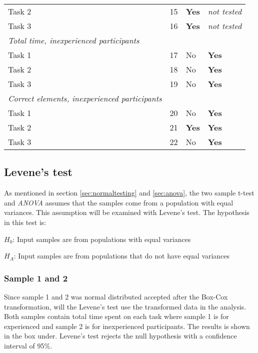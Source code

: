 \begin{longtable}{p{}|l|p{2cm}|p{}}
		Task 2 & 15 & \textbf{Yes}  &  \textit{not tested} \\
		Task 3 & 16 & \textbf{Yes} & \textit{not tested} \\ \hline
		\textit{Total time, inexperienced participants} & & & \\
		Task 1 & 17& No  & \textbf{Yes}  \\
		Task 2 & 18 & No  & \textbf{Yes}   \\
		Task 3 & 19 & No & \textbf{Yes}  \\ \hline
		\textit{Correct elements, inexperienced participants} & & & \\
		Task 1 & 20 & No  & \textbf{Yes} \\
		Task 2 & 21 & \textbf{Yes}  & \textbf{Yes} \\
		Task 3 & 22 & No & \textbf{Yes} \\ \hline
	\end{longtable}

\subsection{Levene's test}
As mentioned in section \ref{sec:normaltesting} and \ref{sec:anova}, the two sample t-test and \textit{ANOVA} assumes that the samples come from a population with equal variances. This assumption will be examined with Levene's test. The hypothesis in this test is: \\[0.5cm]

\centerline{$H_{0}$: Input samples are from populations with equal variances} 
\centerline{$H_{A}$: Input samples are from populations that do not have equal variances}

\subsubsection[Sample 1 and 2]{Sample 1 and 2}\label{sec:sample1,2_levene}
Since sample 1 and 2 was normal distributed accepted after the Box-Cox transformation, will the Levene's test use the transformed data in the analysis. Both samples contain total time spent on each task where sample 1 is for experienced and sample 2 is for inexperienced participants. The results is shown in the box under. Levene's test rejects the null hypothesis with a confidence interval of 95\%. \\[0.2cm]

